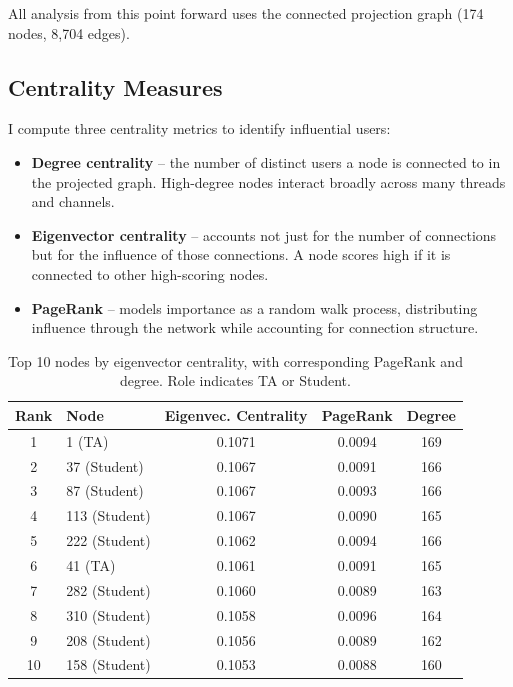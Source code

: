 \documentclass[12pt]{article}
\begin{document}
All analysis from this point forward uses the connected projection graph (174 nodes, 8{,}704 edges).

\subsection{Centrality Measures}

I compute three centrality metrics to identify influential users:

\begin{itemize}
    \item \textbf{Degree centrality} -- the number of distinct users a node is connected to in the projected graph. High-degree nodes interact broadly across many threads and channels.
    \item \textbf{Eigenvector centrality} -- accounts not just for the number of connections but for the influence of those connections. A node scores high if it is connected to other high-scoring nodes.
    \item \textbf{PageRank} -- models importance as a random walk process, distributing influence through the network while accounting for connection structure.
\end{itemize}

\begin{table}[H]
\centering
\caption{Top 10 nodes by eigenvector centrality, with corresponding PageRank and degree. Role indicates TA or Student.}
\label{tab:centrality}
\begin{tabular}{clccc}
\toprule
Rank & Node & Eigenvec. Centrality & PageRank & Degree \\
\midrule
1  & 1 (TA)      & 0.1071 & 0.0094 & 169 \\
2  & 37 (Student) & 0.1067 & 0.0091 & 166 \\
3  & 87 (Student) & 0.1067 & 0.0093 & 166 \\
4  & 113 (Student) & 0.1067 & 0.0090 & 165 \\
5  & 222 (Student) & 0.1062 & 0.0094 & 166 \\
6  & 41 (TA)      & 0.1061 & 0.0091 & 165 \\
7  & 282 (Student) & 0.1060 & 0.0089 & 163 \\
8  & 310 (Student) & 0.1058 & 0.0096 & 164 \\
9  & 208 (Student) & 0.1056 & 0.0089 & 162 \\
10 & 158 (Student) & 0.1053 & 0.0088 & 160 \\
\bottomrule
\end{tabular}
\end{table}
\end{document}
